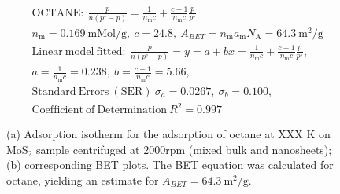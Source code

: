 

\begin{align*}
&\mathrm{OCTANE:}\ \frac{p}{n(p^\circ-p)}=\frac{1}{n_\mathrm{m}c}+\frac{c-1}{n_\mathrm{m}c}\frac{p}{p^\circ}\\
&{n_\mathrm{m}}=0.169\ \mathrm{mMol/g},\ c=24.8,\ A_{BET}={n_\mathrm{m}}{a_\mathrm{m}}{N_\mathrm{A}}=64.3\ \mathrm{m}^2\mathrm{/g}\\
&\mathrm{Linear\ model\ fitted:}\ \frac{p}{n(p^\circ-p)}=y=a+bx=\frac{1}{n_\mathrm{m}c}+\frac{c-1}{n_\mathrm{m}c}\frac{p}{p^\circ},\\
&a=\frac{1}{n_\mathrm{m}c}=0.238,\ b=\frac{c-1}{n_\mathrm{m}c}=5.66,\\
&\mathrm{Standard\ Errors\ (SER)}\ \sigma_a=0.0267,\ \sigma_b=0.100,\\
&\mathrm{Coefficient\ of\ Determination}\ R^2 = 0.997
\end{align*}


\begin{figure}[htb]
\hfill
{}
\caption{(a) Adsorption isotherm for the adsorption of octane at XXX K on MoS$_2$ 
sample centrifuged at 2000rpm (mixed bulk and nanosheets);
(b) corresponding BET plots. The BET equation was calculated for octane, yielding an estimate for $A_{BET}=64.3\ \mathrm{m}^2\mathrm{/g}$.}

\label{fig:sa-Nanosheets-Prep-II-2000rpm-12mg-01-3mm-30C-S1-SA-10ml}
\end{figure}


